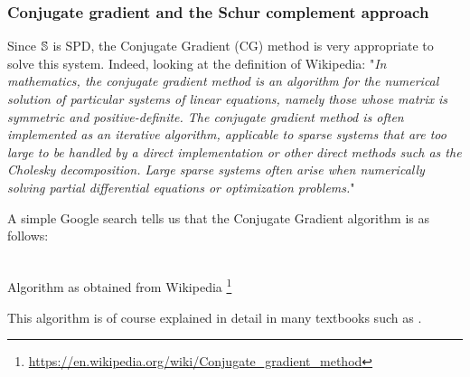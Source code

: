\Literature \cite{cach88,cao03}

















\subsubsection{Conjugate gradient and the Schur complement approach }


 
Since ${\mathbb{S}}$ is SPD, the Conjugate Gradient (CG) method is very appropriate to solve this system. 
Indeed, looking at the definition of Wikipedia: "{\it In mathematics, the conjugate gradient method is an algorithm for the numerical solution of particular systems of linear equations, namely those whose matrix is symmetric and positive-definite. The conjugate gradient method is often implemented as an iterative algorithm, applicable to sparse systems that are too large to be handled by a direct implementation or other direct methods such as the Cholesky decomposition. Large sparse systems often arise when numerically solving partial differential equations or optimization problems.}"

A simple Google search tells us that the Conjugate Gradient algorithm is as follows:
\begin{center}
\\
Algorithm as obtained from Wikipedia \footnote{\url{https://en.wikipedia.org/wiki/Conjugate\_gradient\_method}}
\end{center}
This algorithm is of course explained in detail in many textbooks such as \cite{saad}.

